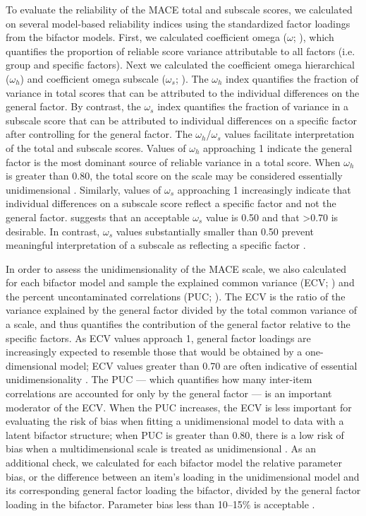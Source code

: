 \documentclass[letterpaper,man,natbib]{apa6}  %
\begin{document}
To evaluate the reliability of the MACE total and subscale scores, we calculated on several model-based reliability indices using the standardized factor loadings from the bifactor models. First, we calculated coefficient omega ($\omega$; \citealt{mcdonald1999test}), which quantifies the proportion of reliable score variance attributable to all factors (i.e. group and specific factors). Next we calculated the coefficient omega hierarchical ($\omega_h$) and coefficient omega subscale ($\omega_s$; \citealt{reise2013applying, rodriguez2016evaluating}). The $\omega_h$ index quantifies the fraction of variance in total scores that can be attributed to the individual differences on the general factor. By contrast, the $\omega_s$ index quantifies the fraction of variance in a subscale score that can be attributed to individual differences on a specific factor after controlling for the general factor. The $\omega_h$/$\omega_s$ values facilitate interpretation of the total and subscale scores. Values of $\omega_h$ approaching 1 indicate the general factor is the most dominant source of reliable variance in a total score. When $\omega_h$ is greater than 0.80, the total score on the scale may be considered essentially unidimensional \citep{rodriguez2016applying}. Similarly, values of $\omega_s$ approaching 1 increasingly indicate that individual differences on a subscale score reflect a specific factor and not the general factor. \cite{canivez2016bifactor} suggests that an acceptable $\omega_s$ value is 0.50 and that >0.70 is desirable. In contrast, $\omega_s$ values substantially smaller than 0.50 prevent meaningful interpretation of a subscale as reflecting a specific factor \citep{gignac2013bifactor}. 

In order to assess the unidimensionality of the MACE scale, we also calculated for each bifactor model and sample the explained common variance (ECV; \citealt{sijtsma2009use}) and the percent uncontaminated correlations (PUC; \citealt{reise2013multidimensionality}). The ECV is the ratio of the variance explained by the general factor divided by the total common variance of a scale, and thus quantifies the contribution of the general factor relative to the specific factors. As ECV values approach 1, general factor loadings are increasingly expected to resemble those that would be obtained by a one-dimensional model; ECV values greater than 0.70 are often indicative of essential unidimensionality \citep{rodriguez2016applying}. The PUC --- which quantifies how many inter-item correlations are accounted for only by the general factor --- is an important moderator of the ECV. When the PUC increases, the ECV is less important for evaluating the risk of bias when fitting a unidimensional model to data with a latent bifactor structure; when PUC is greater than 0.80, there is a low risk of bias when a multidimensional scale is treated as unidimensional \citep{reise2013multidimensionality}. As an additional check, we calculated for each bifactor model the relative parameter bias, or the difference between an item's loading in the unidimensional  model and its corresponding general factor loading the bifactor, divided by the general factor loading in the bifactor. Parameter bias less than 10–15\% is acceptable \citep{muthen1987structural}.
\end{document}
